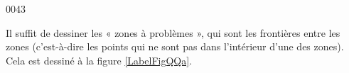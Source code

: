 
\begin{corrige}{0043}

Il suffit de dessiner les « zones à problèmes », qui sont les frontières entre les zones (c'est-à-dire les points qui ne sont pas dans l'intérieur d'une des zones). 
Cela est dessiné à la figure \ref{LabelFigQQa}.
\newcommand{\CaptionFigQQa}{Les zones à problèmes pour l'exercice \ref{exo0043}.}


\end{corrige}
